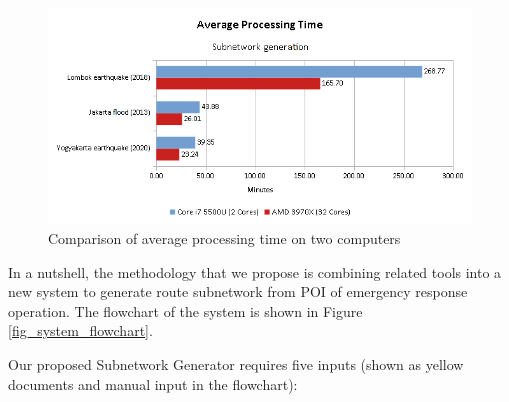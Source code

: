 \documentclass[conference]{IEEEtran}
\begin{document}
\begin{figure}
\centerline{\includegraphics[scale=0.5]{average-processing-time-chart.png}}
\caption{Comparison of average processing time on two computers}
\label{fig_average_processing_time_chart}
\end{figure}

In a nutshell, the methodology that we propose is combining related tools into a new system to generate route subnetwork from POI of emergency response operation. The flowchart of the system is shown in Figure \ref{fig_system_flowchart}.

Our proposed Subnetwork Generator requires five inputs (shown as yellow documents and manual input in the flowchart):
\end{document}
